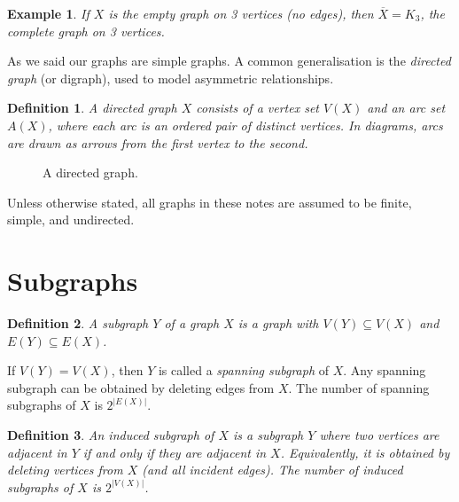 \documentclass[12pt,a4paper,openany]{book}
\newtheorem{definition}{Definition}[section]
\newtheorem{example}{Example}[section]
\begin{document}
\begin{example}
If $X$ is the empty graph on 3 vertices (no edges), then $\overline{X} = K_3$, the complete graph on 3 vertices.
\end{example}

As we said our graphs   are simple graphs.  
A common generalisation is the \emph{directed graph} (or digraph), used to model asymmetric relationships.

\begin{definition}
A \emph{directed graph} $X$ consists of a vertex set $V(X)$ and an \emph{arc set} $A(X)$,  
where each arc is an ordered pair of distinct vertices.  
In diagrams, arcs are drawn as arrows from the first vertex to the second.
\end{definition}

\begin{figure}[h]
\centering
{}
\caption{A directed graph.}
\end{figure}

Unless otherwise stated, all graphs in these notes are assumed to be finite, simple, and undirected.

\section{Subgraphs}

\begin{definition}
A \emph{subgraph} $Y$ of a graph $X$ is a graph with $V(Y) \subseteq V(X)$ and $E(Y) \subseteq E(X)$.
\end{definition}

If $V(Y) = V(X)$, then $Y$ is called a \emph{spanning subgraph} of $X$.  
Any spanning subgraph can be obtained by deleting edges from $X$.  
The number of spanning subgraphs of $X$ is $2^{|E(X)|}$.

\begin{definition}
An \emph{induced subgraph} of $X$ is a subgraph $Y$ where two vertices are adjacent in $Y$  
if and only if they are adjacent in $X$.  
Equivalently, it is obtained by deleting vertices from $X$ (and all incident edges).  
The number of induced subgraphs of $X$ is $2^{|V(X)|}$.
\end{definition}
\end{document}
